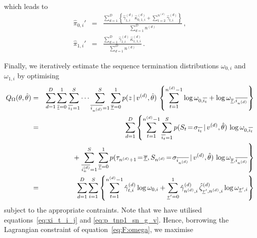 \documentclass[a4paper]{article}
\begin{document}
which leads to
\begin{eqnarray}
\hat{\pi}_{0,i}' & = & 
  \frac{\sum_{d=1}^D\left\{\hat{\gamma}^{(d)}_{1,i}\,\hat{\kappa}^{(d)}_{0,1,i}+\sum_{t=2}^{n^{(d)}}\hat{\gamma}^{(d)}_{t,i}\right\}}
          {\sum_{d=1}^D n^{(d)}}\,,
\nonumber\\
\hat{\pi}_{1,i}' & = & 
  \frac{\sum_{d=1}^D\hat{\gamma}^{(d)}_{1,i}\,\hat{\kappa}^{(d)}_{1,1,i}}
          {\sum_{d=1}^D n^{(d)}}\,.
\end{eqnarray}

Finally, we iteratively estimate the sequence termination distributions $\omega_{0,i}$ and $\omega_{1,i}$ by optimising
\begin{eqnarray}
  Q_{\Omega}(\theta,\hat{\theta}) & = & 
\sum_{d=1}^D
\sum_{\overline{\underline{\iota}}=0}^{1}\sum_{\overline{i_1}=1}^{S}\cdots\sum_{\overline{i_{n^{(d)}}}=1}^{S}
\sum_{\overline{\underline{\tau}}=0}^{1}
p(z\,|\,v^{(d)},\hat{\theta})\,
\left\{\sum_{t=1}^{n^{(d)}-1}\log\omega_{0,\overline{i_t}}+\log\omega_{\overline{\underline{\tau}},\overline{i_{n^{(d)}}}}\right\}
\nonumber\\& = &
\sum_{d=1}^D\left\{\sum_{t=1}^{n^{(d)}-1}\sum_{\overline{i_t}=1}^{S}
p(S_t\!=\!\sigma_{\overline{i_t}}\,|\,v^{(d)},\hat{\theta})\,
\log\omega_{0,\overline{i_t}}\right.
\nonumber\\&&\hspace*{10mm}
+\left.\sum_{\overline{i_n^{(d)}}=1}^{S}
\sum_{\overline{\underline{\tau}}=0}^{1}
p(\tau_{n^{(d)}+1}\!=\!\overline{\underline{\tau}},S_{n^{(d)}}\!=\!\sigma_{\overline{i_{n^{(d)}}}}\,|\,v^{(d)},\hat{\theta})\,
\log\omega_{\overline{\underline{\tau}},\overline{i_{n^{(d)}}}}\right\}
\nonumber\\& = &
\sum_{d=1}^D\sum_{i=1}^{S}\left\{
\sum_{t=1}^{n^{(d)}-1}
\hat{\gamma}_{t,i}^{(d)}\log\omega_{0,i}+
\sum_{\underline{\tau}'=0}^{1}
\hat{\gamma}^{(d)}_{n^{(d)},i}\,\hat{\zeta}_{\underline{\tau}',n^{(d)},i}^{(d)}\log\omega_{\underline{\tau}',i}
\right\}
\end{eqnarray}
subject to the appropriate contraints. Note that we have utilised equations~\eqref{eq:xi_t_i_j} and \eqref{eq:p_tnp1_sn_g_v}.
Hence, borrowing the Lagrangian constraint of equation~\eqref{eq:F:omega}, we maximise
\end{document}
